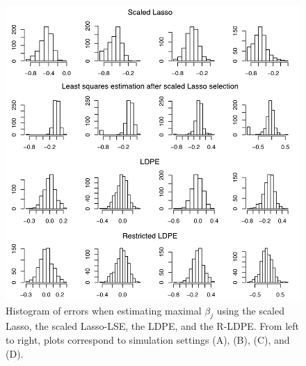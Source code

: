 \documentclass[11pt]{amsart}
\begin{document}
\begin{centering}
\begin{figure}[ht]
\includegraphics{hist_diff.pdf}
\caption{Histogram of errors when estimating maximal $\beta_j$ using the scaled Lasso, 
{the scaled Lasso-LSE}, the LDPE, and the {R-LDPE}. From left to right, 
plots correspond to simulation settings (A), (B), (C), and (D).}
\label{fig:hist}
\end{figure}
\end{centering}
\end{document}
